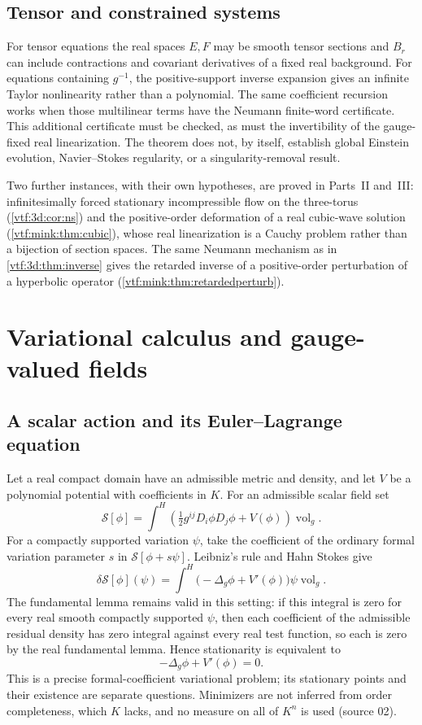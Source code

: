 \documentclass[11pt,letterpaper]{article}
\theoremstyle{definition}
\theoremstyle{remark}
\newcommand{\vol}{\operatorname{vol}}\newcommand{\GL}{\operatorname{GL}}
\begin{document}
\subsection{Tensor and constrained systems}

For tensor equations the real spaces $E,F$ may be smooth tensor sections and
$B_r$ can include contractions and covariant derivatives of a fixed real
background. For equations containing $g^{-1}$, the positive-support inverse
expansion gives an infinite Taylor nonlinearity rather than a polynomial.
The same coefficient recursion works when those multilinear terms have the
Neumann finite-word certificate. This additional certificate must be checked,
as must the invertibility of the gauge-fixed real linearization. The theorem
does not, by itself, establish global Einstein evolution, Navier--Stokes
regularity, or a singularity-removal result.

Two further instances, with their own hypotheses, are proved in Parts~II
and~III: infinitesimally forced stationary incompressible flow on the
three-torus (\cref{vtf:3d:cor:ns}) and the positive-order deformation of a real
cubic-wave solution (\cref{vtf:mink:thm:cubic}), whose real linearization is a
Cauchy problem rather than a bijection of section spaces. The same Neumann
mechanism as in \cref{vtf:3d:thm:inverse} gives the retarded inverse of a
positive-order perturbation of a hyperbolic operator
(\cref{vtf:mink:thm:retardedperturb}).

\section{Variational calculus and gauge-valued fields}\label{vtf:sec:variation}

\subsection{A scalar action and its Euler--Lagrange equation}

Let a real compact domain have an admissible metric and density, and let
$V$ be a polynomial potential with coefficients in $K$. For an admissible
scalar field set
\[
 \mathcal S[\phi]=\int^H
 \left(\tfrac12g^{ij}D_i\phi D_j\phi+V(\phi)\right)\vol_g.
\]
For a compactly supported variation $\psi$, take the coefficient of the
ordinary formal variation parameter $s$ in $\mathcal S[\phi+s\psi]$.
Leibniz's rule and Hahn Stokes give
\[
 \delta\mathcal S[\phi](\psi)
 =\int^H\bigl(-\Delta_g\phi+V'(\phi)\bigr)\psi\vol_g.
\]
The fundamental lemma remains valid in this setting: if this integral is zero
for every real smooth compactly supported $\psi$, then each coefficient of
the admissible residual density has zero integral against every real test
function, so each is zero by the real fundamental lemma. Hence stationarity
is equivalent to
\[
 -\Delta_g\phi+V'(\phi)=0.
\]
This is a precise formal-coefficient variational problem; its stationary
points and their existence are separate questions. Minimizers are not inferred
from order completeness, which $K$ lacks, and no measure on all of $K^n$ is used
(source 02).
\end{document}
